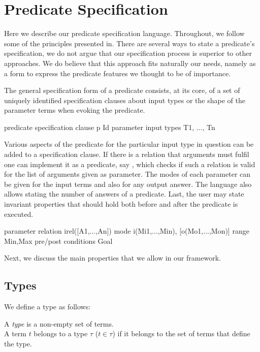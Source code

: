 
\section{Predicate Specification}
\label{sec:pred-spec}

Here we describe our predicate specification language. Throughout, we
follow some of the principles presented in.  
%
There are several ways to state a predicate's specification, we do not
argue that our specification process is superior to other approaches.
%
We do believe that this approach fits naturally our needs, namely as a
form to express the predicate features we thought to be of importance.


The general specification form of a predicate  consists, at its
core, of a set of uniquely identified specification clauses about input
types or the shape of the parameter terms when evoking the predicate.
%
\begin{code}
predicate specification clause
  p Id
parameter input types
  T1, ..., Tn
\end{code}
%
Various aspects of the predicate for the particular input type in
question can be added to a specification clause.
%
If there is a relation that arguments must fulfil one can implement it
as a predicate, say , which checks if such a relation is
valid for the list of arguments given as parameter.
%
The modes of each parameter can be given for the input terms and also
for any output answer. The language also allows stating the number of
answers of a predicate.
%
Last, the user may state invariant properties that should hold both
before and after the predicate is executed.
%
\begin{code}
parameter relation
  irel([A1,...,An])
mode
  i(Mi1,...,Min), [o(Mo1,...,Mon)]
range
  {Min,Max}
pre/post conditions
  Goal
\end{code}
Next, we discuss the main properties that we allow in our framework.

\subsection{Types}

We define a type as follows: 

\begin{definition}
\label{def:type}
A {\em type} is a non-empty set of terms.\\
A term $t$ belongs to a type $\tau$ ($t \in \tau$) if it belongs to the set of
terms that define the type.
\end{definition}


